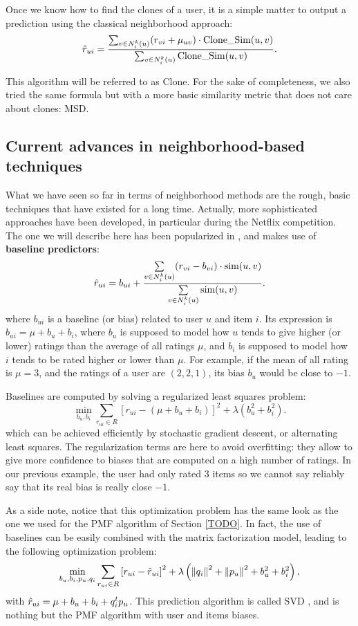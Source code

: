 \noindent
Once we know how to find the clones of a user, it is a simple matter to output
a prediction using the classical neighborhood approach:
$$\hat{r}_{ui} = \frac{\sum_{v \in N_i^k(u)} (r_{vi} + \mu_{uv}) \cdot \text{Clone\_Sim}(u,
v)}{\sum_{v \in N_i^k(u)} \text{Clone\_Sim}(u, v)}.$$

This algorithm will be referred to as Clone. For the sake of completeness, we
also tried the same formula but with a more basic similarity metric that does
not care about clones: MSD.

\subsection{Current advances in neighborhood-based techniques}

What we have seen so far in terms of neighborhood methods are the rough, basic
techniques that have existed for a long time. Actually, more sophisticated
approaches have been developed, in particular during the Netflix competition.
The one we will describe here has been popularized in \cite{BelKorSIGKDD2007},
and makes use of \textbf{baseline predictors}:
$$\hat{r}_{ui} = b_{ui} + \frac{\sum\limits_{v \in N_i^k(u)} (r_{vi} - b_{vi})
\cdot \text{sim}(u, v)} {\sum\limits_{v \in N_i^k(u)}\text{sim}(u, v)}.$$
where $b_{ui}$ is a baseline (or bias) related to user $u$ and item $i$. Its
expression is $b_{ui} = \mu + b_u + b_i$, where $b_u$ is supposed to model how
$u$ tends to give higher (or lower) ratings than the average of all ratings
$\mu$, and $b_i$ is supposed to model how $i$ tends to be rated higher or lower
than $\mu$. For example, if the mean of all rating is $\mu = 3$, and the
ratings of a user are $(2, 2, 1)$, its bias $b_u$ would be close to $-1$.

Baselines are computed by solving a regularized least squares problem:
$$\min_{b_u, b_i} \sum_{r_{ui} \in R} \left[r_{ui} - (\mu + b_u + b_i)\right]^2
+ \lambda \left(b_u^2 + b_i^2 \right).$$
which can be achieved efficiently by stochastic gradient descent, or
alternating least squares. The regularization terms are here to avoid
overfitting: they allow to give more confidence to biases that are computed on
a high number of ratings. In our previous example, the user had only rated $3$
items so we cannot say reliably say that its real bias is really close $-1$.

As a side note, notice that this optimization problem has the same look as the
one we used for the PMF algorithm of Section \ref{TODO}. In fact, the use of
baselines can be easily combined with the matrix factorization model, leading
to the following optimization problem:
$$\min_{b_u, b_i, p_u, q_i} \sum_{r_{ui} \in R} \left[r_{ui} - \hat{r}_{ui}\right]^2
+ \lambda \left({\left\lVert q_i\right\rVert}_{}^2 + {\left\lVert p_u\right\rVert}_{}^2 + b_u^2 + b_i^2 \right),$$
with $\hat{r}_{ui} = \mu + b_u + b_i + q_i^tp_u$. This prediction algorithm is
called SVD \cite{TODO}, and is nothing but the PMF algorithm with user and
items biases.

